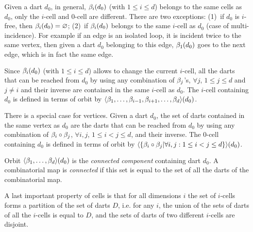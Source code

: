 Given a dart $d_0$, in general, $\beta_{i}(d_0)$ (with $1\leq i \leq d$)
belongs to the same cells as $d_0$, only the $i$-cell and $0$-cell are
different.  There are two exceptions: (1)~if $d_0$ is $i$-free, then
$\beta_{i}(d_0)=\varnothing$; (2)~if $\beta_{i}(d_0)$ belongs to the same $i$-cell
as $d_0$ (case of multi-incidence). For example if an edge is an isolated
loop, it is incident twice to the same vertex, then given a dart $d_0$
belonging to this edge, $\beta_{1}(d_0)$ goes to the next edge, which is in
fact the same edge.

Since $\beta_{i}(d_0)$ (with $1\leq i \leq d$) allows to change the
current $i$-cell, all the darts that can be reached from $d_0$ by
using any combination of $\beta_{j}$'s, $\forall j$, $1 \leq j \leq d$ and
$j\neq i$ and their inverse are contained in the same $i$-cell as
$d_0$.  The $i$-cell containing $d_0$ is defined in terms of orbit by
$\langle{}\beta_1,\ldots,\beta_{i-1},\beta_{i+1},\ldots,\beta_d\rangle{}(d_0)$.


There is a special case for vertices. Given a dart $d_0$, the set of
darts contained in the same vertex as $d_0$ are the darts that can be
reached from $d_0$ by using any combination of $\beta_{i}\circ\beta_{j}$,
$\forall i,j$, $1 \leq i< j \leq d$, and their inverse.  The $0$-cell
containing $d_0$ is defined in terms of orbit by
$\langle{}\{\beta_{i}\circ\beta_{j}|\forall i,j: 1\leq i<j \leq d\}\rangle{}(d_0)$.



Orbit $\langle{}\beta_1,\ldots,\beta_d\rangle{}(d_0)$ is the \emph{connected
  component} containing dart $d_0$. A combinatorial map is
\emph{connected} if this set is equal to the set of all the darts
of the combinatorial map.

%

A last important property of cells is that for all dimensions $i$ the
set of $i$-cells forms a partition of the set of darts $D$, i.e.  for
any $i$, the union of the sets of darts of all the $i$-cells is equal
to $D$, and the sets of darts of two different $i$-cells are disjoint.

